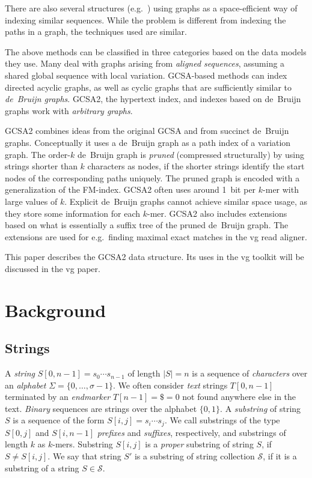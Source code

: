 \documentclass[a4paper,11pt]{llncs}
\newcommand{\set}[1]{\ensuremath{\{ #1 \}}}
\newcommand{\abs}[1]{\ensuremath{\lvert #1 \rvert}}
\newcommand{\kmer}[1]{$#1$\nobreakdash-mer}
\newcommand{\orderk}[1]{order\nobreakdash-$#1$}
\begin{document}
There are also several structures (e.g.~\cite{Huang2010,Wandelt2013,Danek2014,Na2015,Na2016}) using graphs as a space-efficient way of indexing similar sequences. While the problem is different from indexing the paths in a graph, the techniques used are similar.

The above methods can be classified in three categories based on the data models they use. Many deal with graphs arising from \emph{aligned sequences}, assuming a shared global sequence with local variation. GCSA-based methods can index directed acyclic graphs, as well as cyclic graphs that are sufficiently similar to \emph{de~Bruijn graphs}. GCSA2, the hypertext index, and indexes based on de~Bruijn graphs work with \emph{arbitrary graphs}.

GCSA2 combines ideas from the original GCSA and from succinct de~Bruijn graphs. Conceptually it uses a de~Bruijn graph as a path index of a variation graph. The \orderk{k} de~Bruijn graph is \emph{pruned} (compressed structurally) by using strings shorter than $k$ characters as nodes, if the shorter strings identify the start nodes of the corresponding paths uniquely. The pruned graph is encoded with a generalization of the FM\nobreakdash-index. GCSA2 often uses around 1~bit per \kmer{k} with large values of $k$. Explicit de~Bruijn graphs cannot achieve similar space usage, as they store some information for each \kmer{k}. GCSA2 also includes extensions based on what is essentially a suffix tree of the pruned de~Bruijn graph. The extensions are used for e.g.~finding maximal exact matches in the vg read aligner.

This paper describes the GCSA2 data structure. Its uses in the vg toolkit will be discussed in the vg paper.


\section{Background}

\subsection{Strings}\label{sect:strings}

A \emph{string} $S[0, n-1] = s_{0} \dotsm s_{n-1}$ of length $\abs{S} = n$ is a sequence of \emph{characters} over an \emph{alphabet} $\Sigma = \set{0, \dotsc, \sigma - 1}$. We often consider \emph{text} strings $T[0, n-1]$ terminated by an \emph{endmarker} $T[n-1] = \$ = 0$ not found anywhere else in the text. \emph{Binary} sequences are strings over the alphabet $\set{0, 1}$. A \emph{substring} of string $S$ is a sequence of the form $S[i, j] = s_{i} \dotsm s_{j}$. We call substrings of the type $S[0, j]$ and $S[i, n-1]$ \emph{prefixes} and \emph{suffixes}, respectively, and substrings of length $k$ as \kmer{k}s. Substring $S[i, j]$ is a \emph{proper} substring of string $S$, if $S \ne S[i, j]$. We say that string $S'$ is a substring of string collection $\mathcal{S}$, if it is a substring of a string $S \in \mathcal{S}$.
\end{document}

